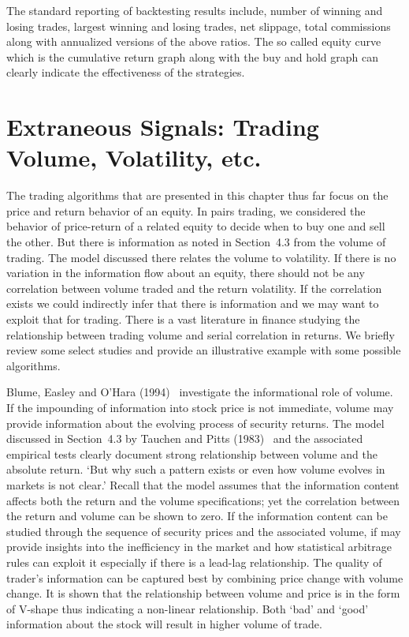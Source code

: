 The standard reporting of backtesting results include, number of winning and losing trades, largest winning and losing trades, net slippage, total commissions along with annualized versions of the above ratios. The so called equity curve which is the cumulative return graph along with the buy and hold graph can clearly indicate the effectiveness of the strategies. 


\section{Extraneous Signals: Trading Volume, Volatility, etc.}


The trading algorithms that are presented in this chapter thus far focus on the price and return behavior of an equity. In pairs trading, we considered the behavior of price-return of a related equity to decide when to buy one and sell the other. But there is information as noted in Section~4.3 from the volume of trading. The model discussed there relates the volume to volatility. If there is no variation in the information flow about an equity, there should not be any correlation between volume traded and the return volatility. If the correlation exists we could indirectly infer that there is information and we may want to exploit that for trading. There is a vast literature in finance studying the relationship between trading volume and serial correlation in returns. We briefly review some select studies and provide an illustrative example with some possible algorithms. 


Blume, Easley and O'Hara (1994)~\cite{blumeohar} investigate the informational role of volume. If the impounding of information into stock price is not immediate, volume may provide information about the evolving process of security returns. The model discussed in Section~4.3 by Tauchen and Pitts (1983)~\cite{tauchenpitts} and the associated empirical tests clearly document strong relationship between volume and the absolute return. `But why such a pattern exists or even how volume evolves in markets is not clear.' Recall that the model assumes that the information content affects both the return and the volume specifications; yet the correlation between the return and volume can be shown to zero. If the information content can be studied through the sequence of security prices and the associated volume, if may provide insights into the inefficiency in the market and how statistical arbitrage rules can exploit it especially if there is a lead-lag relationship. The quality of trader's information can be captured best by combining price change with volume change. It is shown that the relationship between volume and price is in the form of V-shape thus indicating a non-linear relationship. Both `bad' and `good' information about the stock will result in higher volume of trade. 


